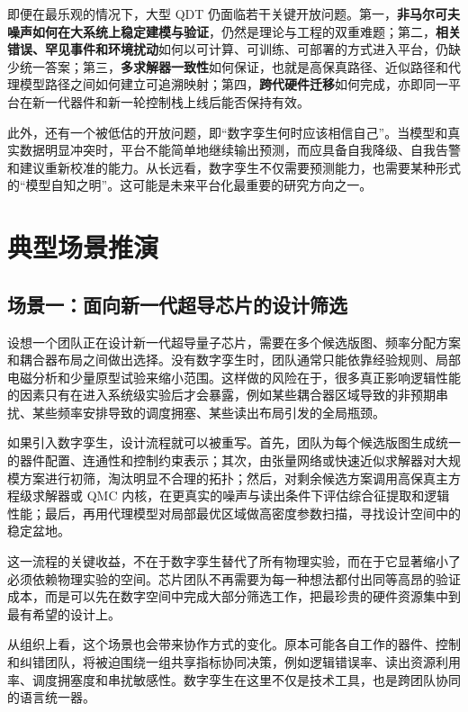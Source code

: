 \documentclass[11pt,a4paper]{article}
\newcommand{\QDT}{QDT}
\begin{document}
即便在最乐观的情况下，大型 \QDT{} 仍面临若干关键开放问题。第一，\textbf{非马尔可夫噪声如何在大系统上稳定建模与验证}，仍然是理论与工程的双重难题；第二，\textbf{相关错误、罕见事件和环境扰动}如何以可计算、可训练、可部署的方式进入平台，仍缺少统一答案；第三，\textbf{多求解器一致性}如何保证，也就是高保真路径、近似路径和代理模型路径之间如何建立可追溯映射；第四，\textbf{跨代硬件迁移}如何完成，亦即同一平台在新一代器件和新一轮控制栈上线后能否保持有效。

此外，还有一个被低估的开放问题，即“数字孪生何时应该相信自己”。当模型和真实数据明显冲突时，平台不能简单地继续输出预测，而应具备自我降级、自我告警和建议重新校准的能力。从长远看，数字孪生不仅需要预测能力，也需要某种形式的“模型自知之明”。这可能是未来平台化最重要的研究方向之一。

\section{典型场景推演}

\subsection{场景一：面向新一代超导芯片的设计筛选}

设想一个团队正在设计新一代超导量子芯片，需要在多个候选版图、频率分配方案和耦合器布局之间做出选择。没有数字孪生时，团队通常只能依靠经验规则、局部电磁分析和少量原型试验来缩小范围。这样做的风险在于，很多真正影响逻辑性能的因素只有在进入系统级实验后才会暴露，例如某些耦合器区域导致的非预期串扰、某些频率安排导致的调度拥塞、某些读出布局引发的全局瓶颈。

如果引入数字孪生，设计流程就可以被重写。首先，团队为每个候选版图生成统一的器件配置、连通性和控制约束表示；其次，由张量网络或快速近似求解器对大规模方案进行初筛，淘汰明显不合理的拓扑；然后，对剩余候选方案调用高保真主方程级求解器或 QMC 内核，在更真实的噪声与读出条件下评估综合征提取和逻辑性能；最后，再用代理模型对局部最优区域做高密度参数扫描，寻找设计空间中的稳定盆地。

这一流程的关键收益，不在于数字孪生替代了所有物理实验，而在于它显著缩小了必须依赖物理实验的空间。芯片团队不再需要为每一种想法都付出同等高昂的验证成本，而是可以先在数字空间中完成大部分筛选工作，把最珍贵的硬件资源集中到最有希望的设计上。

从组织上看，这个场景也会带来协作方式的变化。原本可能各自工作的器件、控制和纠错团队，将被迫围绕一组共享指标协同决策，例如逻辑错误率、读出资源利用率、调度拥塞度和串扰敏感性。数字孪生在这里不仅是技术工具，也是跨团队协同的语言统一器。
\end{document}
